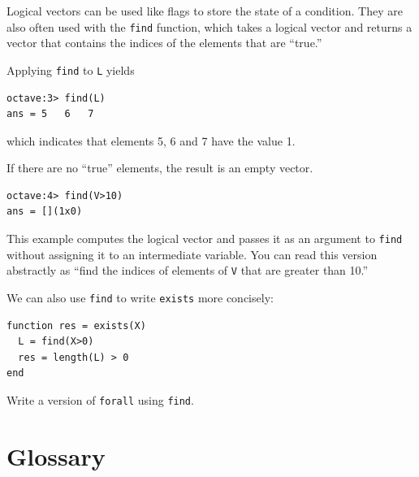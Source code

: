 \documentclass{book}
\begin{document}
Logical vectors can be used like flags to store the state of
a condition. They are also often used with the {\tt find} function,
which takes a logical vector and returns a vector that contains
the indices of the elements that are ``true.''

Applying {\tt find} to {\tt L} yields

\begin{verbatim}
octave:3> find(L)
ans = 5   6   7
\end{verbatim}

which indicates that elements 5, 6 and 7 have the value 1.

If there are no ``true'' elements, the result is an empty vector.

\begin{verbatim}
octave:4> find(V>10)
ans = [](1x0)
\end{verbatim}

This example computes the logical vector and passes it as an
argument to {\tt find} without assigning it to an intermediate
variable. You can read this version abstractly as ``find
the indices of elements of {\tt V} that are greater than 10.''

We can also use {\tt find} to write {\tt exists} more concisely:

\begin{verbatim}
function res = exists(X)
  L = find(X>0)
  res = length(L) > 0
end
\end{verbatim}

\begin{ex}
Write a version of {\tt forall} using {\tt find}.
\end{ex}


\section{Glossary}
\end{document}
